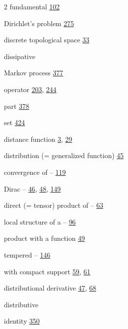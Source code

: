\begin{multicols}{2}
\hspace*{1.1em}fundamental \hyperlink{page.102}{102}\par
\noindent Dirichlet's problem \hyperlink{page.275}{275}\par
\noindent discrete topological space \hyperlink{page.33}{33}\par
\noindent dissipative\par
\hspace*{1.1em}Markov process \hyperlink{page.377}{377}\par
\hspace*{1.1em}operator \hyperlink{page.203}{203}, \hyperlink{page.244}{244}\par
\hspace*{1.1em}part \hyperlink{page.378}{378}\par
\hspace*{1.1em}set \hyperlink{page.424}{424}\par
\noindent distance function \hyperlink{page.3}{3}, \hyperlink{page.29}{29}\par
\noindent distribution (= generalized function) \hyperlink{page.45}{45}\par
\hspace*{1.1em}convergence of -- \hyperlink{page.119}{119}\par
\hspace*{1.1em}Dirac -- \hyperlink{page.46}{46}, \hyperlink{page.48}{48}, \hyperlink{page.149}{149}\par
\hspace*{1.1em}direct (= tensor) product of -- \hyperlink{page.63}{63}\par
\hspace*{1.1em}local structure of a -- \hyperlink{page.96}{96}\par
\hspace*{1.1em}product with a function \hyperlink{page.49}{49}\par
\hspace*{1.1em}tempered -- \hyperlink{page.146}{146}\par
\hspace*{1.1em}with compact support \hyperlink{page.59}{59}, \hyperlink{page.61}{61}\par
\noindent distributional derivative \hyperlink{page.47}{47}, \hyperlink{page.68}{68}\par
\noindent distributive\par
\hspace*{1.1em}identity \hyperlink{page.350}{350}\par

\end{multicols}
